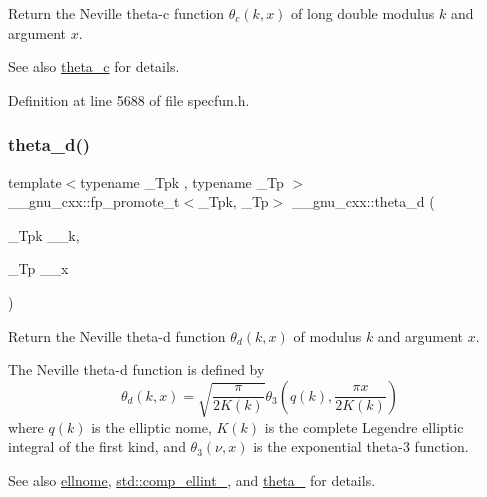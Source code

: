 Return the Neville theta-\/c function $ \theta_c(k,x) $ of {\ttfamily long double} modulus $ k $ and argument $ x $.

\begin{DoxySeeAlso}{See also}
\hyperlink{group__gnu__math__spec__func_ga3ebbb6513c39e1d55b08cba7d169ce3d}{theta\+\_\+c} for details. 
\end{DoxySeeAlso}


Definition at line 5688 of file specfun.\+h.

\mbox{\label{group__gnu__math__spec__func_ga258edb995137d9e6344b3cd750266d74}} 
\subsubsection{\texorpdfstring{theta\+\_\+d()}{theta\_d()}}
{\footnotesize\ttfamily template$<$typename \+\_\+\+Tpk , typename \+\_\+\+Tp $>$ \\
\+\_\+\+\_\+gnu\+\_\+cxx\+::fp\+\_\+promote\+\_\+t$<$\+\_\+\+Tpk, \+\_\+\+Tp$>$ \+\_\+\+\_\+gnu\+\_\+cxx\+::theta\+\_\+d (\begin{DoxyParamCaption}\item[{\+\_\+\+Tpk}]{\+\_\+\+\_\+k,  }\item[{\+\_\+\+Tp}]{\+\_\+\+\_\+x }\end{DoxyParamCaption})\hspace{0.3cm}{\ttfamily [inline]}}

Return the Neville theta-\/d function $ \theta_d(k,x) $ of modulus $ k $ and argument $ x $.

The Neville theta-\/d function is defined by \[ \theta_d(k,x) = \sqrt{\frac{\pi}{2K(k)}} \theta_3\left(q(k),\frac{\pi x}{2K(k)}\right) \] where $ q(k) $ is the elliptic nome, $ K(k) $ is the complete Legendre elliptic integral of the first kind, and $ \theta_3(\nu,x) $ is the exponential theta-\/3 function. \begin{DoxySeeAlso}{See also}
\hyperlink{group__gnu__math__spec__func_ga7bfb34f8b5c0ed7c72040f9cb7034bba}{ellnome}, \hyperlink{group__tr29124__math__spec__func_gad559217fb01e7a8b7a6e23eeedda64be}{std\+::comp\+\_\+ellint\+\_}, and \hyperlink{group__gnu__math__spec__func_ga146c3b8e86991e164d4bf143cda5f0fc}{theta\+\_} for details.
\end{DoxySeeAlso}

